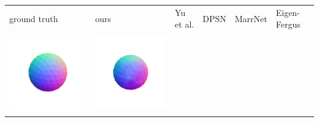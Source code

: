 \begin{center}
\begin{tabularx}{\linewidth}{@{}Y@{}Y@{}Y@{}Y@{}Y@{}Y@{}}
ground truth & ours & Yu et al. & DPSN & MarrNet & Eigen-Fergus \\
\includegraphics[width=\linewidth]{semisynthetic/20150514_1_gt.png} &
\includegraphics[width=\linewidth]{semisynthetic/20150514_1_ours_out.png} &

\end{tabularx}
\end{center}
